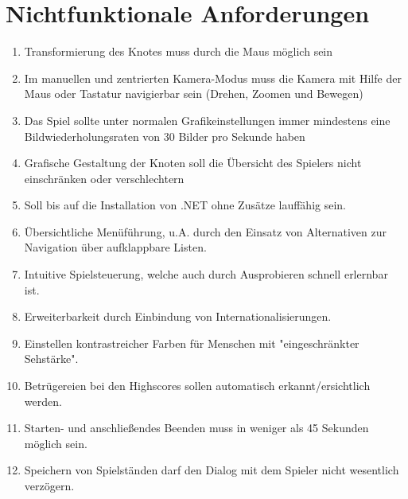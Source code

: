 \chapter{Nichtfunktionale Anforderungen}

\renewcommand{\theenumi}{/NF\_\arabic{enumi}0/}
\renewcommand{\labelenumi}{\theenumi}

\begin{enumerate}

\item Transformierung des Knotes muss durch die Maus möglich sein %
\item Im manuellen und zentrierten Kamera-Modus muss die Kamera mit Hilfe der Maus oder Tastatur navigierbar sein (Drehen, Zoomen und Bewegen) %
\item Das Spiel sollte unter normalen Grafikeinstellungen immer mindestens eine Bildwiederholungsraten von 30 Bilder pro Sekunde haben 
\item Grafische Gestaltung der Knoten soll die Übersicht des Spielers nicht einschränken oder verschlechtern 
\item Soll bis auf die Installation von .NET ohne Zusätze lauffähig sein. 
\item Übersichtliche Menüführung, u.A. durch den Einsatz von Alternativen zur Navigation über aufklappbare Listen. %
\item Intuitive Spielsteuerung, welche auch durch Ausprobieren schnell erlernbar ist. 
\item Erweiterbarkeit durch Einbindung von Internationalisierungen. %
\item Einstellen kontrastreicher Farben für Menschen mit "eingeschränkter Sehstärke". 
\item Betrügereien bei den Highscores sollen automatisch erkannt/ersichtlich werden. 
\item Starten- und anschließendes Beenden muss in weniger als 45 Sekunden möglich sein. %
\item Speichern von Spielständen darf den Dialog mit dem Spieler nicht wesentlich verzögern. %

\end{enumerate}
